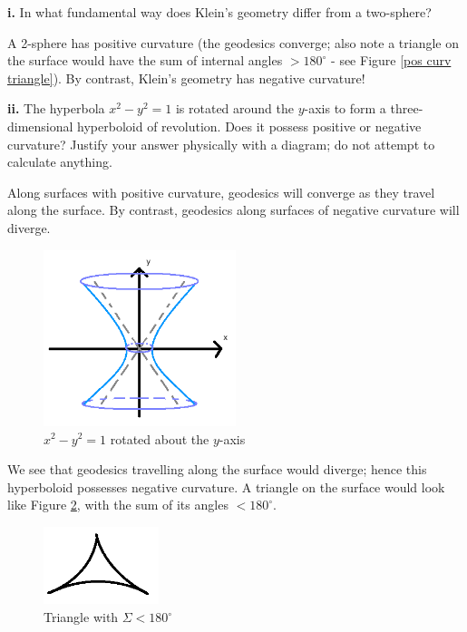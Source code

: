 \documentclass[a4paper]{article} %
\begin{document}
\begin{framed}
\textbf{i.} In what fundamental way does Klein's geometry differ from a two-sphere?
\end{framed}

A 2-sphere has positive curvature (the geodesics converge; also note a triangle on the surface would have the sum of internal angles $>180^{\circ}$ - see Figure \ref{pos curv triangle}). By contrast, Klein's geometry has negative curvature!

\pagebreak  %

\begin{framed}
\textbf{ii.} The hyperbola $x^2-y^2=1$ is rotated around the $y$-axis to form a three-dimensional hyperboloid of revolution. Does it possess positive or negative curvature? Justify your answer physically with a diagram; do not attempt to calculate anything.
\end{framed}

Along surfaces with positive curvature, geodesics will converge as they travel along the surface. By contrast, geodesics along surfaces of negative curvature will diverge.

\begin{figure}[h]
\centering
\includegraphics[width=0.5\textwidth]{images/dii.png}
\caption{$x^2-y^2=1$ rotated about the $y$-axis}
\label{dii figure}
\end{figure}

We see that geodesics travelling along the surface would diverge; hence this hyperboloid possesses negative curvature. A triangle on the surface would look like Figure \ref{neg curv triangle}, with the sum of its angles $< 180^{\circ}$.

\begin{figure}[h]
\centering
\includegraphics[width=0.3\textwidth]{images/negativeCurvTriangle.png}
\caption{Triangle with $\Sigma<180^{\circ}$}
\label{neg curv triangle}
\end{figure}
\end{document}
